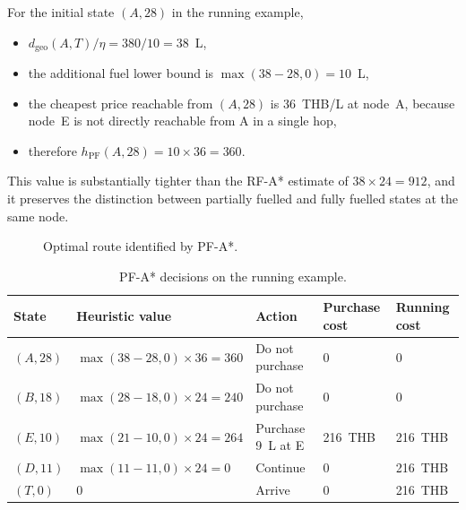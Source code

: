 For the initial state $(A,28)$ in the running example,
\begin{itemize}
    \item $d_{\mathrm{geo}}(A,T)/\eta = 380/10 = 38$~L,
    \item the additional fuel lower bound is $\max(38-28,0)=10$~L,
    \item the cheapest price reachable from $(A,28)$ is 36~THB/L at node~A, because node~E is not directly reachable from A in a single hop,
    \item therefore $h_{\mathrm{PF}}(A,28)=10\times36=360$.
\end{itemize}
This value is substantially tighter than the RF-A* estimate of $38\times24=912$, and it preserves the distinction between partially fuelled and fully fuelled states at the same node.

\begin{figure}[ht]
\centering
{}
\caption{Optimal route identified by PF-A*.}
\label{fig:pfastar_route}
\end{figure}

\begin{table}[ht]
\centering
\caption{PF-A* decisions on the running example.}
\label{tab:pfastar_trace}
\small
\begin{tabular}{@{}lllll@{}}
\toprule
State & Heuristic value & Action & Purchase cost & Running cost \\
\midrule
$(A,28)$ & $\max(38-28,0)\times36 = 360$ & Do not purchase & 0 & 0 \\
$(B,18)$ & $\max(28-18,0)\times24 = 240$ & Do not purchase & 0 & 0 \\
$(E,10)$ & $\max(21-10,0)\times24 = 264$ & Purchase 9~L at E & 216~THB & 216~THB \\
$(D,11)$ & $\max(11-11,0)\times24 = 0$ & Continue & 0 & 216~THB \\
$(T,0)$ & 0 & Arrive & 0 & 216~THB \\
\bottomrule
\end{tabular}
\end{table}

